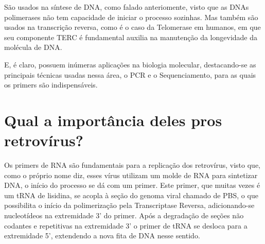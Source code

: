 \documentclass[
]{book}
\begin{document}
São usados na síntese de DNA, como falado anteriomente, visto que as DNAs polimerases não tem capacidade de iniciar o processo sozinhas. Mas também são usados na transcrição reversa, como é o caso da Telomerase em humanos, em que seu componente TERC é fundamental auxilia na manutenção da longevidade da molécula de DNA.

E, é claro, possuem inúmeras aplicações na biologia molecular, destacando-se as principais técnicas usadas nessa área, o PCR e o Sequenciamento, para as quais os primers são indispensáveis.

\hypertarget{qual-a-importuxe2ncia-deles-pros-retrovuxedrus}{%
\section{Qual a importância deles pros retrovírus?}\label{qual-a-importuxe2ncia-deles-pros-retrovuxedrus}}

Os primers de RNA são fundamentais para a replicação dos retrovírus, visto que, como o próprio nome diz, esses vírus utilizam um molde de RNA para sintetizar DNA, o início do processo se dá com um primer. Este primer, que muitas vezes é um tRNA de lisidina, se acopla à seção do genoma viral chamado de PBS, o que possibilita o início da polimerização pela Transcriptase Reversa, adicionando-se nucleotídeos na extremidade 3' do primer. Após a degradação de seções não codantes e repetitivas na extremidade 3' o primer de tRNA se desloca para a extremidade 5', extendendo a nova fita de DNA nesse sentido.

  
\end{document}

